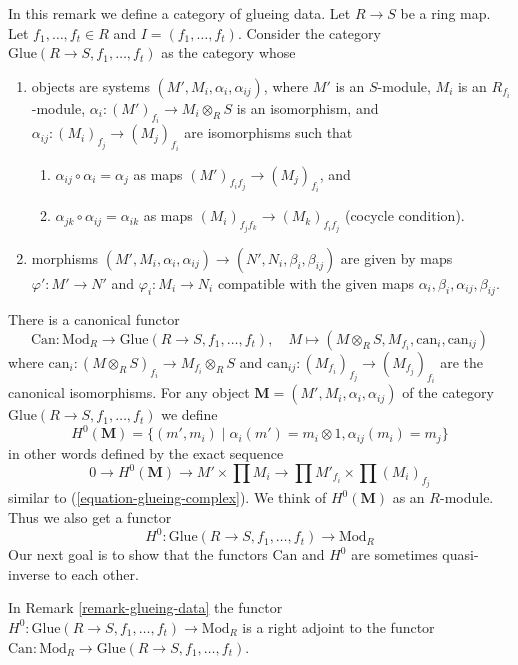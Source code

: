 \begin{remark}
\label{remark-glueing-data}
In this remark we define a category of glueing data.
Let $R \to S$ be a ring map.
Let $f_1, \ldots, f_t \in R$ and $I = (f_1, \ldots, f_t)$.
Consider the category $\text{Glue}(R \to S, f_1, \ldots, f_t)$
as the category whose
\begin{enumerate}
\item objects are systems $(M', M_i, \alpha_i, \alpha_{ij})$, where
$M'$ is an $S$-module, $M_i$ is an $R_{f_i}$-module,
$\alpha_i : (M')_{f_i} \to M_i \otimes_R S$ is an isomorphism, and
$\alpha_{ij} : (M_i)_{f_j} \to (M_j)_{f_i}$ are isomorphisms
such that
\begin{enumerate}
\item $\alpha_{ij} \circ \alpha_i = \alpha_j$ as maps
$(M')_{f_if_j} \to (M_j)_{f_i}$, and
\item $\alpha_{jk} \circ \alpha_{ij} = \alpha_{ik}$ as maps
$(M_i)_{f_jf_k} \to (M_k)_{f_if_j}$ (cocycle condition).
\end{enumerate}
\item morphisms
$(M', M_i, \alpha_i, \alpha_{ij}) \to (N', N_i, \beta_i, \beta_{ij})$
are given by maps $\varphi' : M' \to N'$ and $\varphi_i : M_i \to N_i$
compatible with the given maps $\alpha_i, \beta_i, \alpha_{ij}, \beta_{ij}$.
\end{enumerate}
There is a canonical functor
$$
\text{Can} : \text{Mod}_R
\longrightarrow
\text{Glue}(R \to S, f_1, \ldots, f_t),
\quad
M \longmapsto (M \otimes_R S, M_{f_i}, \text{can}_i, \text{can}_{ij})
$$
where $\text{can}_i : (M \otimes_R S)_{f_i} \to M_{f_i} \otimes_R S$
and $\text{can}_{ij} : (M_{f_i})_{f_j} \to (M_{f_j})_{f_i}$
are the canonical isomorphisms. For any object
$\mathbf{M} = (M', M_i, \alpha_i, \alpha_{ij})$ of the category
$\text{Glue}(R \to S, f_1, \ldots, f_t)$ we define
$$
H^0(\mathbf{M}) =
\{(m', m_i) \mid \alpha_i(m') = m_i \otimes 1, \alpha_{ij}(m_i) = m_j\}
$$
in other words defined by the exact sequence
$$
0 \to H^0(\mathbf{M}) \to
M' \times \prod M_i \to
\prod M'_{f_i}
\times
\prod (M_i)_{f_j}
$$
similar to (\ref{equation-glueing-complex}).
We think of $H^0(\mathbf{M})$ as an $R$-module. Thus we also get a functor
$$
H^0 :
\text{Glue}(R \to S, f_1, \ldots, f_t)
\longrightarrow
\text{Mod}_R
$$
Our next goal is to show that the functors
$\text{Can}$ and $H^0$ are sometimes quasi-inverse to each other.
\end{remark}

\begin{lemma}
\label{lemma-H0-Can-adjoint}
In Remark \ref{remark-glueing-data} the functor
$H^0 : \text{Glue}(R \to S, f_1, \ldots, f_t) \to \text{Mod}_R$
is a right adjoint to the functor
$\text{Can} : \text{Mod}_R \to \text{Glue}(R \to S, f_1, \ldots, f_t)$.
\end{lemma}

